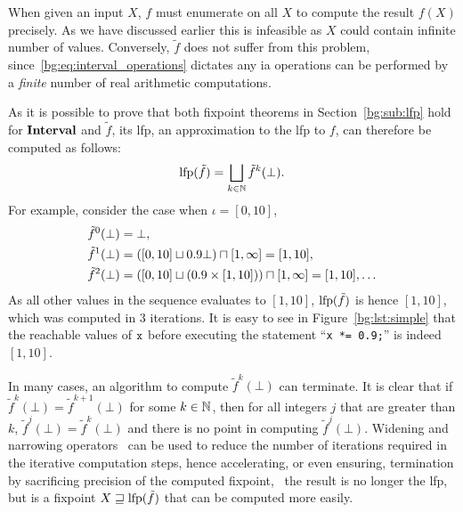 When given an input $X$, $f$ must enumerate on all $X$ to compute the result
$f(X)$ precisely.  As we have discussed earlier this is infeasible as $X$
could contain infinite number of values.  Conversely, $\tilde{f}$ does not
suffer from this problem, since~\eqref{bg:eq:interval_operations} dictates
any \gls{ia} operations can be performed by a \emph{finite} number of real
arithmetic computations.

As it is possible to prove that both fixpoint theorems in
Section~\ref{bg:sub:lfp} hold for $\mathbf{Interval}$ and $\tilde{f}$, its
\gls{lfp}, an approximation to the \gls{lfp} to $f$, can therefore be computed
as follows:
\begin{equation}
    \operatorname{\mathrm{lfp}} (\tilde{f}) = \bigsqcup_{k \in \mathbb{N}} \tilde{f}^k (\bot).
\end{equation}
For example, consider the case when $\iota = [0, 10]$,
\begin{equation}
    \begin{aligned}
        \tilde{f}^0 (\bot) &= \bot, \\
        \tilde{f}^1 (\bot) &= \left(
                [0, 10] \sqcup 0.9 \bot
            \right) \sqcap [1, \infty] = [1, 10], \\
        \tilde{f}^2 (\bot) &= \left(
                [0, 10] \sqcup \left( 0.9 \times [1, 10] \right)
            \right) \sqcap [1, \infty] = [1, 10], \mathellipsis
    \end{aligned}
\end{equation}
As all other values in the sequence evaluates to $[1, 10]$, $\operatorname{\mathrm{lfp}}(\tilde{f})$
is hence $[1, 10]$, which was computed in 3 iterations.  It is easy to see
in Figure~\ref{bg:lst:simple} that the reachable values of $\texttt{x}$ before
executing the statement ``\verb|x *= 0.9;|'' is indeed $[1, 10]$.

In many cases, an algorithm to compute $\tilde{f}^k(\bot)$ can terminate.
It is clear that if $\tilde{f}^k(\bot) = \tilde{f}^{k+1}(\bot)$ for some
$k \in \mathbb{N}$, then for all integers $j$ that are greater than $k$,
$\tilde{f}^{j}(\bot) = \tilde{f}^{k}(\bot)$ and there is no point in computing
$\tilde{f}^{j}(\bot)$.  Widening and narrowing operators~\cite{cousot77,
nielson99} can be used to reduce the number of iterations required in the
iterative computation steps, hence accelerating, or even ensuring, termination
by sacrificing precision of the computed fixpoint, \ie~the result is no longer
the \gls{lfp}, but is a fixpoint $X \sqsupseteq \operatorname{\mathrm{lfp}}(\tilde{f})$ that can be
computed more easily.

